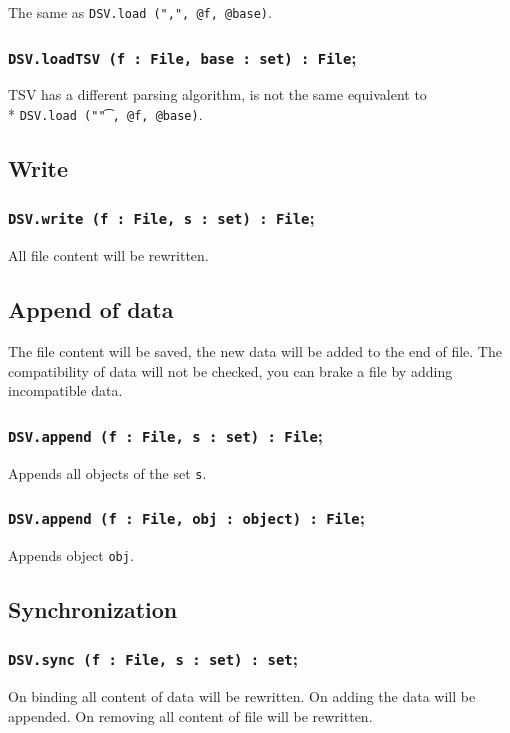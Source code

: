 The same as \texttt{DSV.load (",", @f, @base)}.

\subsubsection{\texttt{DSV.loadTSV (f : File, base : set) : File};}

TSV has a different parsing algorithm, is not the same equivalent to \\* \texttt{DSV.load ("\t", @f, @base)}.

\subsection{Write}

\subsubsection{\texttt{DSV.write (f : File, s : set) : File};}

All file content will be rewritten.

\subsection{Append of data}

The file content will be saved, the new data will be added to the end of file. The compatibility of data will not be checked, you can brake a file by adding incompatible data.

\subsubsection{\texttt{DSV.append (f : File, s : set) : File};}

Appends all objects of the set \texttt{s}.

\subsubsection{\texttt{DSV.append (f : File, obj : object) : File};}

Appends object \texttt{obj}.

\subsection{Synchronization}

\subsubsection{\texttt{DSV.sync (f : File, s : set) : set};}

On binding all content of data will be rewritten. On adding the data will be appended. On removing all content of file will be rewritten.
